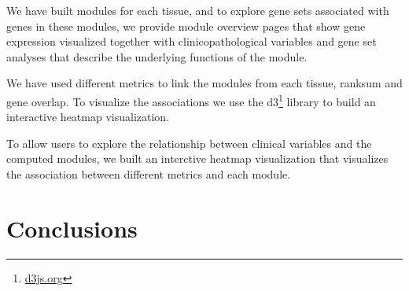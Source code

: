 We have built modules for each tissue, and to explore gene sets associated with
genes in these modules, we provide module overview pages that show gene
expression visualized together with clinicopathological variables and gene set
analyses that describe the underlying functions of the module. 

We have used different metrics to link the modules from each tissue, ranksum and
gene overlap. To visualize the associations we use the
d3\footnote{\url{d3js.org}} library to build an interactive heatmap
visualization. 

To allow users to explore the relationship between clinical variables and the
computed modules, we built an interctive heatmap visualization that visualizes
the association between different metrics and each module. 



\section*{Conclusions}
